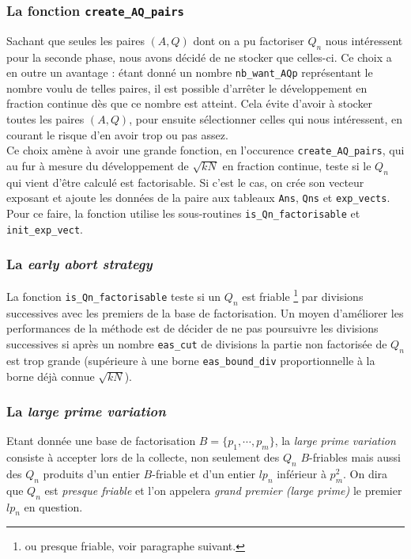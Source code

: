 \subsubsection{La fonction \texttt{create\_AQ\_pairs}}

Sachant que seules les paires $(A,Q)$ dont on a pu factoriser $Q_n$ nous
intéressent pour la seconde phase, nous avons décidé de ne stocker que celles-ci.
Ce choix a en outre un avantage : étant donné un nombre \texttt{nb\_want\_AQp}
représentant le nombre voulu de telles paires, il est possible d'arrêter le 
développement en fraction continue dès que ce nombre est atteint. Cela évite
d'avoir à stocker toutes les paires $(A,Q)$, pour ensuite sélectionner celles 
qui nous intéressent, en courant le risque d'en avoir trop ou pas assez. \\

Ce choix amène à avoir une grande fonction, en l'occurence 
\texttt{create\_AQ\_pairs}, qui au fur à mesure du développement de $\sqrt{kN}$
en fraction continue, teste si le $Q_n$ qui vient d'être calculé est factorisable.
Si c'est le cas, on crée son vecteur exposant et ajoute les données de la paire
aux tableaux \texttt{Ans}, \texttt{Qns} et \texttt{exp\_vects}. Pour ce faire, la
fonction utilise les sous-routines \texttt{is\_Qn\_factorisable} et 
\texttt{init\_exp\_vect}.

\subsubsection{La \textit{early abort strategy}}

La fonction \texttt{is\_Qn\_factorisable} teste si un $Q_n$ est friable 
\footnote {ou presque friable, voir paragraphe suivant.} par divisions successives
avec les premiers de la base de factorisation.  Un moyen d'améliorer les 
performances de la méthode est de décider de ne pas poursuivre les divisions 
successives si après un nombre \texttt{eas\_cut} de divisions la partie non
factorisée de $Q_n$ est trop grande (supérieure à une borne 
\texttt{eas\_bound\_div} proportionnelle à la borne déjà connue $\sqrt{kN}$). 

\subsubsection{La \textit{large prime variation }}

Etant donnée une base de factorisation $B = \{ p_1, \cdots, p_m\}$, la \textit{large
prime variation } consiste à accepter lors de la collecte, non seulement des 
$Q_n$ $B$-friables mais aussi des $Q_n$ produits d'un entier $B$-friable et d'un
entier $lp_n$ inférieur à $p_m^2$. On dira que $Q_n$ est \emph{presque friable}
et l'on appelera \emph{grand premier (large prime)} le premier $lp_n$ en question. \\


